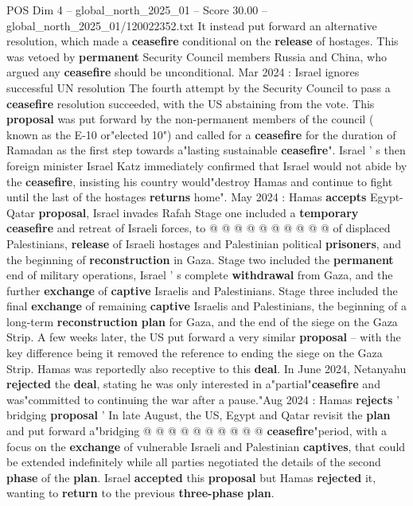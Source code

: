 \begin{textsample}{POS Dim 4 – global\_north\_2025\_01 – Score 30.00 – global\_north\_2025\_01/120022352.txt}
It instead put forward an alternative resolution, which made a \textbf{ceasefire} conditional on the \textbf{release} of hostages.
This was vetoed by \textbf{permanent} Security Council members Russia and China, who argued any \textbf{ceasefire} should be unconditional.
Mar 2024 : Israel ignores successful UN resolution The fourth attempt by the Security Council to pass a \textbf{ceasefire} resolution succeeded, with the US abstaining from the vote.
This \textbf{proposal} was put forward by the non-permanent members of the council ( known as the E-10 or"elected 10") and called for a \textbf{ceasefire} for the duration of Ramadan as the first step towards a"lasting sustainable \textbf{ceasefire}".
Israel ' s then foreign minister Israel Katz immediately confirmed that Israel would not abide by the \textbf{ceasefire}, insisting his country would"destroy Hamas and continue to fight until the last of the hostages \textbf{returns} home".
May 2024 : Hamas \textbf{accepts} Egypt-Qatar \textbf{proposal}, Israel invades Rafah Stage one included a \textbf{temporary} \textbf{ceasefire} and retreat of Israeli forces, to @ @ @ @ @ @ @ @ @ @ of displaced Palestinians, \textbf{release} of Israeli hostages and Palestinian political \textbf{prisoners}, and the beginning of \textbf{reconstruction} in Gaza.
Stage two included the \textbf{permanent} end of military operations, Israel ' s complete \textbf{withdrawal} from Gaza, and the further \textbf{exchange} of \textbf{captive} Israelis and Palestinians.
Stage three included the final \textbf{exchange} of remaining \textbf{captive} Israelis and Palestinians, the beginning of a long-term \textbf{reconstruction} \textbf{plan} for Gaza, and the end of the siege on the Gaza Strip.
A few weeks later, the US put forward a very similar \textbf{proposal} -- with the key difference being it removed the reference to ending the siege on the Gaza Strip.
Hamas was reportedly also receptive to this \textbf{deal}.
In June 2024, Netanyahu \textbf{rejected} the \textbf{deal}, stating he was only interested in a"partial"\textbf{ceasefire} and was"committed to continuing the war after a pause."Aug 2024 : Hamas \textbf{rejects} ' bridging \textbf{proposal} ' In late August, the US, Egypt and Qatar revisit the \textbf{plan} and put forward a"bridging @ @ @ @ @ @ @ @ @ @ \textbf{ceasefire}"period, with a focus on the \textbf{exchange} of vulnerable Israeli and Palestinian \textbf{captives}, that could be extended indefinitely while all parties negotiated the details of the second \textbf{phase} of the \textbf{plan}.
Israel \textbf{accepted} this \textbf{proposal} but Hamas \textbf{rejected} it, wanting to \textbf{return} to the previous \textbf{three-phase} \textbf{plan}.

\end{textsample}
